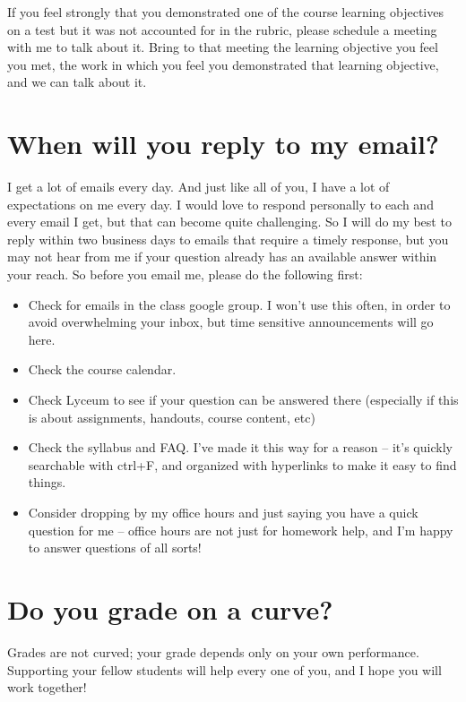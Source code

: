 \documentclass[
  letterpaper,
  DIV=11,
  numbers=noendperiod]{scrartcl}
\providecommand{\tightlist}{%
  \setlength{\itemsep}{0pt}\setlength{\parskip}{0pt}}
\begin{document}
If you feel strongly that you demonstrated one of the course learning
objectives on a test but it was not accounted for in the rubric, please
schedule a meeting with me to talk about it. Bring to that meeting the
learning objective you feel you met, the work in which you feel you
demonstrated that learning objective, and we can talk about it.

\section{When will you reply to my email?}\label{emails}

I get a lot of emails every day. And just like all of you, I have a lot
of expectations on me every day. I would love to respond personally to
each and every email I get, but that can become quite challenging. So I
will do my best to reply within two business days to emails that require
a timely response, but you may not hear from me if your question already
has an available answer within your reach. So before you email me,
please do the following first:

\begin{itemize}
\tightlist
\item
  Check for emails in the class google group. I won't use this often, in
  order to avoid overwhelming your inbox, but time sensitive
  announcements will go here.
\item
  Check the course calendar.
\item
  Check Lyceum to see if your question can be answered there (especially
  if this is about assignments, handouts, course content, etc)
\item
  Check the syllabus and FAQ. I've made it this way for a reason -- it's
  quickly searchable with ctrl+F, and organized with hyperlinks to make
  it easy to find things.
\item
  Consider dropping by my office hours and just saying you have a quick
  question for me -- office hours are not just for homework help, and
  I'm happy to answer questions of all sorts!
\end{itemize}

\section{Do you grade on a curve?}\label{gradingcurve}

Grades are not curved; your grade depends only on your own performance.
Supporting your fellow students will help every one of you, and I hope
you will work together!
\end{document}
